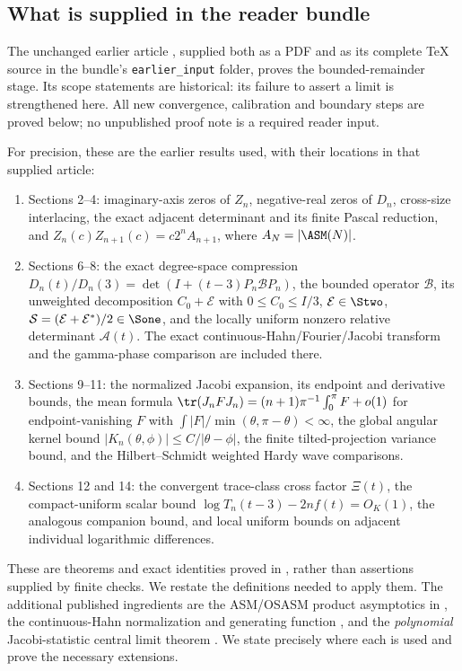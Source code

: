 \subsection{What is supplied in the reader bundle}
The unchanged earlier article \cite{r124}, supplied both as a PDF and
as its complete TeX source in the bundle's \texttt{earlier\_input}
folder, proves the bounded-remainder stage. Its scope statements are
historical: its failure to assert a limit is strengthened here. All
new convergence, calibration and boundary steps are proved below;
no unpublished proof note is a required reader input.

For precision, these are the earlier results used, with their locations
in that supplied article:
\begin{enumerate}[label=\textup{(I\arabic*)}]
\item Sections 2--4: imaginary-axis zeros of $Z_n$, negative-real zeros
of $D_n$, cross-size interlacing, the exact adjacent determinant and
its finite Pascal reduction, and
$Z_n(c)Z_{n+1}(c)=c2^n A_{n+1}$, where $A_N=|\ASM(N)|$.
\item Sections 6--8: the exact degree-space compression
$D_n(t)/D_n(3)=\det(I+(t-3)P_n\mathcal B P_n)$, the bounded operator
$\mathcal B$, its unweighted decomposition $C_0+\mathcal E$ with
$0\le C_0\le I/3$, $\mathcal E\in\Stwo$,
$\mathcal S=(\mathcal E+\mathcal E^*)/2\in\Sone$, and the locally
uniform nonzero relative determinant $\mathcal A(t)$.
The exact continuous-Hahn/Fourier/Jacobi transform and the gamma-phase
comparison are included there.
\item Sections 9--11: the normalized Jacobi expansion, its endpoint
and derivative bounds, the mean formula
$\tr(J_nFJ_n)=(n+1)\pi^{-1}\int_0^\pi F+o(1)$ for endpoint-vanishing
$F$ with $\int |F|/\min(\theta,\pi-\theta)<\infty$, the global
angular kernel bound $|K_n(\theta,\phi)|\le C/|\theta-\phi|$, the
finite tilted-projection variance bound, and the Hilbert--Schmidt
weighted Hardy wave comparisons.
\item Sections 12 and 14: the convergent trace-class cross factor
$\Xi(t)$, the compact-uniform scalar bound
$\log T_n(t-3)-2nf(t)=O_K(1)$, the analogous companion bound, and
local uniform bounds on adjacent individual logarithmic differences.
\end{enumerate}
These are theorems and exact identities proved in \cite{r124}, rather
than assertions supplied by finite checks. We restate the definitions
needed to apply them. The additional published ingredients are the
ASM/OSASM product asymptotics in \cite{bfk}, the continuous-Hahn
normalization and generating function \cite{cll,dlmf}, and the
\emph{polynomial} Jacobi-statistic central limit theorem \cite{bd}.
We state precisely where each is used and prove the necessary extensions.

